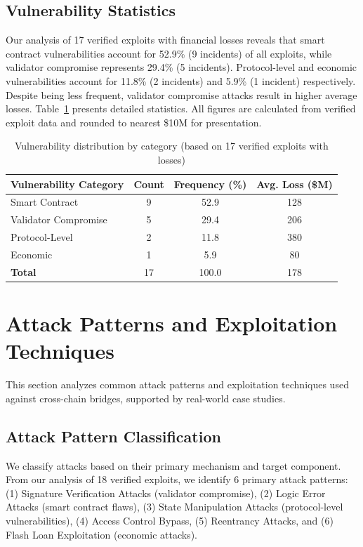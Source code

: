 \documentclass[runningheads]{llncs}
\begin{document}
\subsection{Vulnerability Statistics}
Our analysis of 17 verified exploits with financial losses reveals that smart contract vulnerabilities account for 52.9\% (9 incidents) of all exploits, while validator compromise represents 29.4\% (5 incidents). Protocol-level and economic vulnerabilities account for 11.8\% (2 incidents) and 5.9\% (1 incident) respectively. Despite being less frequent, validator compromise attacks result in higher average losses. Table~\ref{tab:vulnerability_stats} presents detailed statistics. All figures are calculated from verified exploit data and rounded to nearest \$10M for presentation.

\begin{table}[!ht]
    \centering
    \caption{Vulnerability distribution by category (based on 17 verified exploits with losses)}
    \label{tab:vulnerability_stats}
    \begin{tabular}{lccc}
        \toprule
        \textbf{Vulnerability Category} & \textbf{Count} & \textbf{Frequency (\%)} & \textbf{Avg. Loss (\$M)} \\
        \midrule
        Smart Contract & 9 & 52.9 & 128 \\
        Validator Compromise & 5 & 29.4 & 206 \\
        Protocol-Level & 2 & 11.8 & 380 \\
        Economic & 1 & 5.9 & 80 \\
        \midrule
        \textbf{Total} & 17 & 100.0 & 178 \\
        \bottomrule
    \end{tabular}
\end{table}

\vspace{-0.3cm}
\section{Attack Patterns and Exploitation Techniques}
\label{sec:attacks}

This section analyzes common attack patterns and exploitation techniques used against cross-chain bridges, supported by real-world case studies.

\subsection{Attack Pattern Classification}
We classify attacks based on their primary mechanism and target component. From our analysis of 18 verified exploits, we identify 6 primary attack patterns: (1) Signature Verification Attacks (validator compromise), (2) Logic Error Attacks (smart contract flaws), (3) State Manipulation Attacks (protocol-level vulnerabilities), (4) Access Control Bypass, (5) Reentrancy Attacks, and (6) Flash Loan Exploitation (economic attacks).
\end{document}
